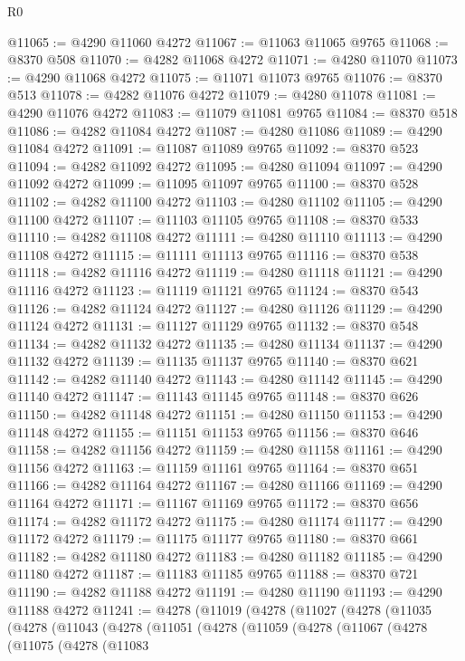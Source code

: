 \begin{lexlean}{R0}
\begin{coremodule}
@11065 := @4290 @11060 @4272
@11067 := @11063 @11065 @9765
@11068 := @8370 @508
@11070 := @4282 @11068 @4272
@11071 := @4280 @11070
@11073 := @4290 @11068 @4272
@11075 := @11071 @11073 @9765
@11076 := @8370 @513
@11078 := @4282 @11076 @4272
@11079 := @4280 @11078
@11081 := @4290 @11076 @4272
@11083 := @11079 @11081 @9765
@11084 := @8370 @518
@11086 := @4282 @11084 @4272
@11087 := @4280 @11086
@11089 := @4290 @11084 @4272
@11091 := @11087 @11089 @9765
@11092 := @8370 @523
@11094 := @4282 @11092 @4272
@11095 := @4280 @11094
@11097 := @4290 @11092 @4272
@11099 := @11095 @11097 @9765
@11100 := @8370 @528
@11102 := @4282 @11100 @4272
@11103 := @4280 @11102
@11105 := @4290 @11100 @4272
@11107 := @11103 @11105 @9765
@11108 := @8370 @533
@11110 := @4282 @11108 @4272
@11111 := @4280 @11110
@11113 := @4290 @11108 @4272
@11115 := @11111 @11113 @9765
@11116 := @8370 @538
@11118 := @4282 @11116 @4272
@11119 := @4280 @11118
@11121 := @4290 @11116 @4272
@11123 := @11119 @11121 @9765
@11124 := @8370 @543
@11126 := @4282 @11124 @4272
@11127 := @4280 @11126
@11129 := @4290 @11124 @4272
@11131 := @11127 @11129 @9765
@11132 := @8370 @548
@11134 := @4282 @11132 @4272
@11135 := @4280 @11134
@11137 := @4290 @11132 @4272
@11139 := @11135 @11137 @9765
@11140 := @8370 @621
@11142 := @4282 @11140 @4272
@11143 := @4280 @11142
@11145 := @4290 @11140 @4272
@11147 := @11143 @11145 @9765
@11148 := @8370 @626
@11150 := @4282 @11148 @4272
@11151 := @4280 @11150
@11153 := @4290 @11148 @4272
@11155 := @11151 @11153 @9765
@11156 := @8370 @646
@11158 := @4282 @11156 @4272
@11159 := @4280 @11158
@11161 := @4290 @11156 @4272
@11163 := @11159 @11161 @9765
@11164 := @8370 @651
@11166 := @4282 @11164 @4272
@11167 := @4280 @11166
@11169 := @4290 @11164 @4272
@11171 := @11167 @11169 @9765
@11172 := @8370 @656
@11174 := @4282 @11172 @4272
@11175 := @4280 @11174
@11177 := @4290 @11172 @4272
@11179 := @11175 @11177 @9765
@11180 := @8370 @661
@11182 := @4282 @11180 @4272
@11183 := @4280 @11182
@11185 := @4290 @11180 @4272
@11187 := @11183 @11185 @9765
@11188 := @8370 @721
@11190 := @4282 @11188 @4272
@11191 := @4280 @11190
@11193 := @4290 @11188 @4272
@11241 := @4278
    (@11019
      (@4278
        (@11027
          (@4278
            (@11035
              (@4278
                (@11043
                  (@4278
                    (@11051
                      (@4278
                        (@11059
                          (@4278
                            (@11067
                              (@4278
                                (@11075
                                  (@4278
                                    (@11083

\end{coremodule}
\end{lexlean}

